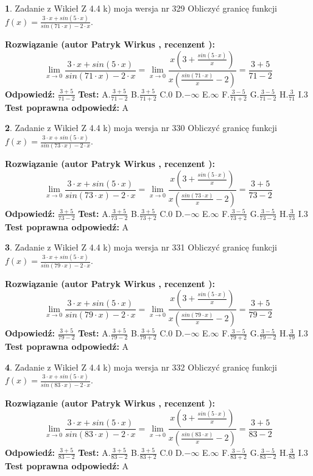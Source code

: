 \documentclass[12pt, a4paper]{article}
\theoremstyle{definition} %
\newtheorem{zad}{}
\newcommand{\zadStart}[1]{\begin{zad}#1\newline}
\newcommand{\zadStop}{\end{zad}}
\newcommand{\rozwStart}[2]{\noindent \textbf{Rozwiązanie (autor #1 , recenzent #2): }\newline}
\newcommand{\rozwStop}{\newline}
\newcommand{\odpStart}{\noindent \textbf{Odpowiedź:}\newline}
\newcommand{\odpStop}{\newline}
\newcommand{\testStart}{\noindent \textbf{Test:}\newline}
\newcommand{\testStop}{\newline}
\newcommand{\kluczStart}{\noindent \textbf{Test poprawna odpowiedź:}\newline}
\newcommand{\kluczStop}{\newline}
\begin{document}
\zadStart{Zadanie z Wikieł Z 4.4 k) moja wersja nr 329}
Obliczyć granicę funkcji $f(x)=\frac{3\cdot x +sin(5\cdot x)}{sin(71\cdot x) -2\cdot x}$.
\zadStop
\rozwStart{Patryk Wirkus}{}
$$\lim\limits_{x\to 0}\frac{3\cdot x +sin(5\cdot x)}{sin(71\cdot x) -2\cdot x}
=\lim\limits_{x\to 0}\frac{x(3+\frac{sin(5\cdot x)}{x})}{x(\frac{sin(71\cdot x)}{x}-2)}
=\frac{3+5}{71-2}$$
\rozwStop
\odpStart
$\frac{3+5}{71-2}$
\odpStop
\testStart
A.$\frac{3+5}{71-2}$
B.$\frac{3+5}{71+2}$
C.$0$
D.$-\infty$
E.$\infty$
F.$\frac{3-5}{71+2}$
G.$\frac{3-5}{71-2}$
H.$\frac{3}{71}$
I.$3$
\testStop
\kluczStart
A
\kluczStop



\zadStart{Zadanie z Wikieł Z 4.4 k) moja wersja nr 330}
Obliczyć granicę funkcji $f(x)=\frac{3\cdot x +sin(5\cdot x)}{sin(73\cdot x) -2\cdot x}$.
\zadStop
\rozwStart{Patryk Wirkus}{}
$$\lim\limits_{x\to 0}\frac{3\cdot x +sin(5\cdot x)}{sin(73\cdot x) -2\cdot x}
=\lim\limits_{x\to 0}\frac{x(3+\frac{sin(5\cdot x)}{x})}{x(\frac{sin(73\cdot x)}{x}-2)}
=\frac{3+5}{73-2}$$
\rozwStop
\odpStart
$\frac{3+5}{73-2}$
\odpStop
\testStart
A.$\frac{3+5}{73-2}$
B.$\frac{3+5}{73+2}$
C.$0$
D.$-\infty$
E.$\infty$
F.$\frac{3-5}{73+2}$
G.$\frac{3-5}{73-2}$
H.$\frac{3}{73}$
I.$3$
\testStop
\kluczStart
A
\kluczStop



\zadStart{Zadanie z Wikieł Z 4.4 k) moja wersja nr 331}
Obliczyć granicę funkcji $f(x)=\frac{3\cdot x +sin(5\cdot x)}{sin(79\cdot x) -2\cdot x}$.
\zadStop
\rozwStart{Patryk Wirkus}{}
$$\lim\limits_{x\to 0}\frac{3\cdot x +sin(5\cdot x)}{sin(79\cdot x) -2\cdot x}
=\lim\limits_{x\to 0}\frac{x(3+\frac{sin(5\cdot x)}{x})}{x(\frac{sin(79\cdot x)}{x}-2)}
=\frac{3+5}{79-2}$$
\rozwStop
\odpStart
$\frac{3+5}{79-2}$
\odpStop
\testStart
A.$\frac{3+5}{79-2}$
B.$\frac{3+5}{79+2}$
C.$0$
D.$-\infty$
E.$\infty$
F.$\frac{3-5}{79+2}$
G.$\frac{3-5}{79-2}$
H.$\frac{3}{79}$
I.$3$
\testStop
\kluczStart
A
\kluczStop



\zadStart{Zadanie z Wikieł Z 4.4 k) moja wersja nr 332}
Obliczyć granicę funkcji $f(x)=\frac{3\cdot x +sin(5\cdot x)}{sin(83\cdot x) -2\cdot x}$.
\zadStop
\rozwStart{Patryk Wirkus}{}
$$\lim\limits_{x\to 0}\frac{3\cdot x +sin(5\cdot x)}{sin(83\cdot x) -2\cdot x}
=\lim\limits_{x\to 0}\frac{x(3+\frac{sin(5\cdot x)}{x})}{x(\frac{sin(83\cdot x)}{x}-2)}
=\frac{3+5}{83-2}$$
\rozwStop
\odpStart
$\frac{3+5}{83-2}$
\odpStop
\testStart
A.$\frac{3+5}{83-2}$
B.$\frac{3+5}{83+2}$
C.$0$
D.$-\infty$
E.$\infty$
F.$\frac{3-5}{83+2}$
G.$\frac{3-5}{83-2}$
H.$\frac{3}{83}$
I.$3$
\testStop
\kluczStart
A
\kluczStop
\end{document}
